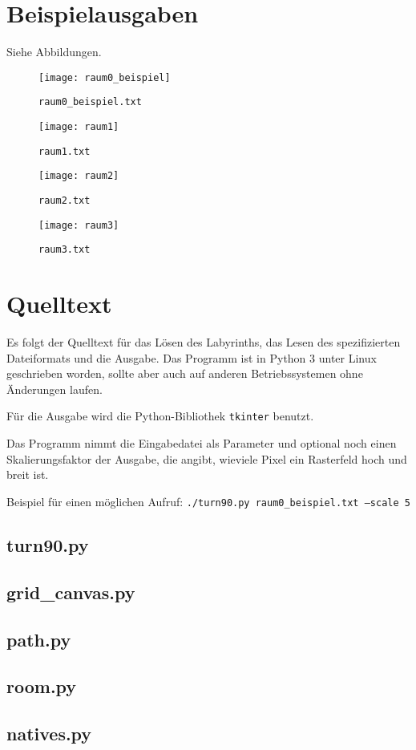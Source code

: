 \documentclass{scrartcl}
\newcommand{\src}[1]{\texttt{#1}}
\begin{document}
\section{Beispielausgaben}
Siehe Abbildungen.
\begin{figure}
	\center\texttt{[image: raum0\_beispiel]}
	\caption{\src{raum0\_beispiel.txt}}
\end{figure}

\begin{figure}
	\center\texttt{[image: raum1]}
	\caption{\src{raum1.txt}}
\end{figure}

\begin{figure}
	\center\texttt{[image: raum2]}
	\caption{\src{raum2.txt}}
\end{figure}

\begin{figure}
	\texttt{[image: raum3]}
	\caption{\src{raum3.txt}}
\end{figure}

\newpage\appendix
\section{Quelltext}
Es folgt der Quelltext für das Lösen des Labyrinths, das Lesen des
spezifizierten Dateiformats und die Ausgabe. Das Programm ist in Python 3 unter
Linux geschrieben worden, sollte aber auch auf anderen Betriebssystemen ohne
Änderungen laufen.

Für die Ausgabe wird die Python-Bibliothek \src{tkinter} benutzt.

Das Programm nimmt die Eingabedatei als Parameter und optional noch einen
Skalierungsfaktor der Ausgabe, die angibt, wieviele Pixel ein Rasterfeld hoch
und breit ist.

Beispiel für einen möglichen Aufruf: \src{./turn90.py raum0\_beispiel.txt %
--scale 5}

\newcommand{\InputSource}[1]{\subsection*{#1.py}}

\InputSource{turn90}
\subsection*{grid\_canvas.py}
\InputSource{path}
\InputSource{room}
\InputSource{natives}
\end{document}
